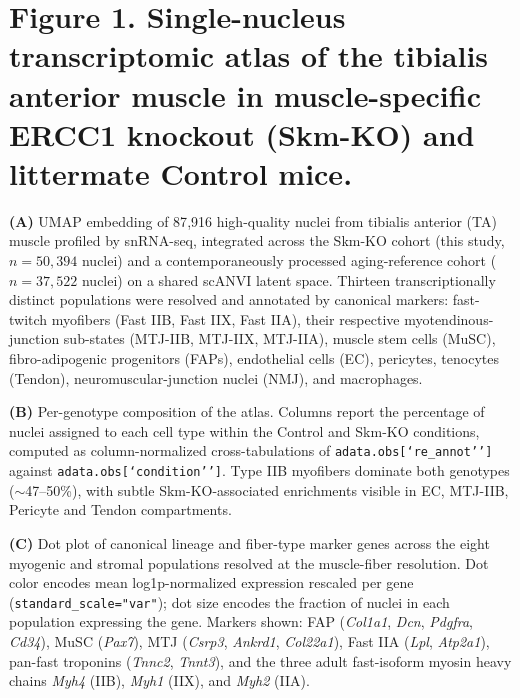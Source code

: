%
%

\section*{Figure 1. Single-nucleus transcriptomic atlas of the tibialis anterior muscle in muscle-specific ERCC1 knockout (Skm-KO) and littermate Control mice.}

\textbf{(A)} UMAP embedding of 87{,}916 high-quality nuclei from tibialis anterior (TA) muscle profiled by snRNA-seq, integrated across the Skm-KO cohort (this study, $n=50{,}394$ nuclei) and a contemporaneously processed aging-reference cohort ($n=37{,}522$ nuclei) on a shared scANVI latent space. Thirteen transcriptionally distinct populations were resolved and annotated by canonical markers: fast-twitch myofibers (Fast IIB, Fast IIX, Fast IIA), their respective myotendinous-junction sub-states (MTJ-IIB, MTJ-IIX, MTJ-IIA), muscle stem cells (MuSC), fibro-adipogenic progenitors (FAPs), endothelial cells (EC), pericytes, tenocytes (Tendon), neuromuscular-junction nuclei (NMJ), and macrophages.

\textbf{(B)} Per-genotype composition of the atlas. Columns report the percentage of nuclei assigned to each cell type within the Control and Skm-KO conditions, computed as column-normalized cross-tabulations of \texttt{adata.obs[`re\_annot'']} against \texttt{adata.obs[`condition'']}. Type IIB myofibers dominate both genotypes ($\sim$47--50\%), with subtle Skm-KO-associated enrichments visible in EC, MTJ-IIB, Pericyte and Tendon compartments.

\textbf{(C)} Dot plot of canonical lineage and fiber-type marker genes across the eight myogenic and stromal populations resolved at the muscle-fiber resolution. Dot color encodes mean log1p-normalized expression rescaled per gene (\texttt{standard\_scale="var"}); dot size encodes the fraction of nuclei in each population expressing the gene. Markers shown: FAP (\textit{Col1a1}, \textit{Dcn}, \textit{Pdgfra}, \textit{Cd34}), MuSC (\textit{Pax7}), MTJ (\textit{Csrp3}, \textit{Ankrd1}, \textit{Col22a1}), Fast IIA (\textit{Lpl}, \textit{Atp2a1}), pan-fast troponins (\textit{Tnnc2}, \textit{Tnnt3}), and the three adult fast-isoform myosin heavy chains \textit{Myh4} (IIB), \textit{Myh1} (IIX), and \textit{Myh2} (IIA).

